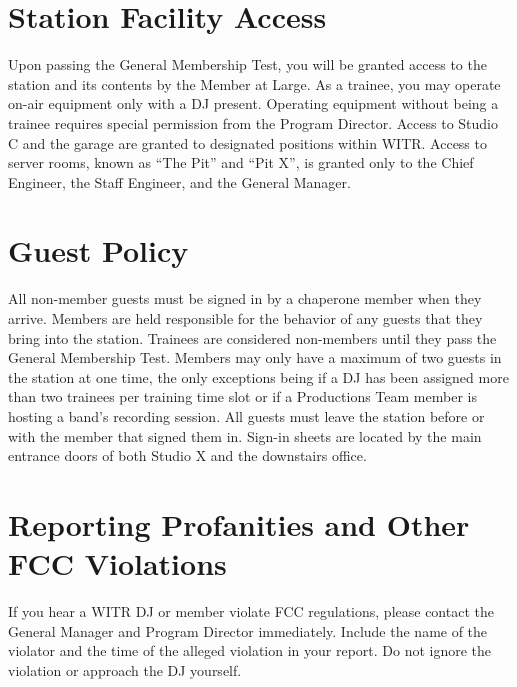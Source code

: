\documentclass{witrman}
\begin{document}
\section{Station Facility Access}
Upon passing the General Membership Test, you will be granted access to the
station and its contents by the Member at Large. As a trainee, you may operate
on-air equipment only with a DJ present. Operating equipment without being a
trainee requires special permission from the Program Director. Access to Studio
C and the garage are granted to designated positions within WITR\@. Access to
server rooms, known as ``The Pit'' and ``Pit X'', is granted only to the Chief
Engineer, the Staff Engineer, and the General Manager.

\section{Guest Policy}
All non-member guests must be signed in by a chaperone member when they arrive.
Members are held responsible for the behavior of any guests that they bring into
the station. Trainees are considered non-members until they pass the General
Membership Test. Members may only have a maximum of two guests in the station at
one time, the only exceptions being if a DJ has been assigned more than two
trainees per training time slot or if a Productions Team member is hosting a
band’s recording session. All guests must leave the station before or with the
member that signed them in. Sign-in sheets are located by the main entrance
doors of both Studio X and the downstairs office.

\section{Reporting Profanities and Other FCC Violations}
If you hear a WITR DJ or member violate FCC regulations, please contact the
General Manager and Program Director immediately. Include the name of the
violator and the time of the alleged violation in your report. Do not ignore the
violation or approach the DJ yourself.
\end{document}
